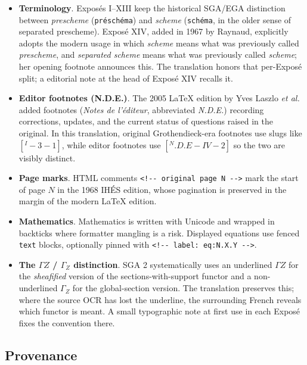 \documentclass[
]{article}
\begin{document}
\begin{itemize}
\item
  \textbf{Terminology}. Exposés I--XIII keep the historical SGA/EGA
  distinction between \emph{prescheme} (\texttt{préschéma}) and
  \emph{scheme} (\texttt{schéma}, in the older sense of separated
  prescheme). Exposé XIV, added in 1967 by Raynaud, explicitly adopts
  the modern usage in which \emph{scheme} means what was previously
  called \emph{prescheme}, and \emph{separated scheme} means what was
  previously called \emph{scheme}; her opening footnote announces this.
  The translation honors that per-Exposé split; a editorial note at the
  head of Exposé XIV recalls it.
\item
  \textbf{Editor footnotes (N.D.E.)}. The 2005 LaTeX edition by Yves
  Laszlo \emph{et al.} added footnotes (\emph{Notes de l'éditeur},
  abbreviated \emph{N.D.E.}) recording corrections, updates, and the
  current status of questions raised in the original. In this
  translation, original Grothendieck-era footnotes use slugs like
  \([{}^{I}-3-1]\), while editor footnotes use \([{}^{N}.D.E-IV-2]\) so
  the two are visibly distinct.
\item
  \textbf{Page marks}. HTML comments
  \texttt{\textless{}!-\/-\ original\ page\ N\ -\/-\textgreater{}} mark
  the start of page \(N\) in the 1968 IHÉS edition, whose pagination is
  preserved in the margin of the modern LaTeX edition.
\item
  \textbf{Mathematics}. Mathematics is written with Unicode and wrapped
  in backticks where formatter mangling is a risk. Displayed equations
  use fenced
  \texttt{\textasciigrave{}\textasciigrave{}\textasciigrave{}text}
  blocks, optionally pinned with
  \texttt{\textless{}!-\/-\ label:\ eq:N.X.Y\ -\/-\textgreater{}}.
\item
  \textbf{The \(\Gamma Z\) / \(\Gamma_{Z}\) distinction}. SGA 2
  systematically uses an underlined \(\Gamma Z\) for the
  \emph{sheafified} version of the sections-with-support functor and a
  non-underlined \(\Gamma_{Z}\) for the global-section version. The
  translation preserves this; where the source OCR has lost the
  underline, the surrounding French reveals which functor is meant. A
  small typographic note at first use in each Exposé fixes the
  convention there.
\end{itemize}

\subsection{Provenance}\label{provenance}
\end{document}
